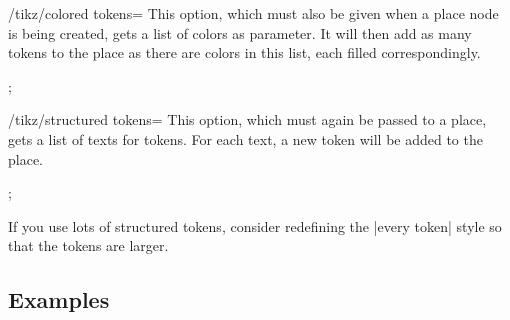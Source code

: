 \begin{key}{/tikz/colored tokens=}
  This option, which must also be given when a place node is being
  created, gets a list of colors as parameter. It will then add as
  many tokens to the place as there are colors in this list, each filled correspondingly.
\begin{codeexample}[]
\tikz  \node[place,colored tokens={black,black,red,blue}] {};
\end{codeexample}
\end{key}
\begin{key}{/tikz/structured tokens=}
  This option, which must again be passed to a place, gets a list of 
  texts for tokens. For each text, a new token will be added to the place.
\begin{codeexample}[]
\tikz  \node[place,structured tokens={$x$,$y$,$z$}] {};
\end{codeexample}
\begin{codeexample}[]
\end{codeexample}
  If you use lots of structured tokens, consider redefining the
  |every token| style so that the tokens are larger.
\end{key}


\subsection{Examples}


